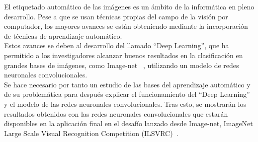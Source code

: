 El etiquetado automático de las imágenes es un ámbito de la informática en pleno desarrollo. Pese a que se usan técnicas propias del campo de la visión por computador, los mayores avances se están obteniendo mediante la incorporación de técnicas de aprendizaje automático.\\

Estos avances se deben al desarrollo del llamado ``Deep Learning'', que ha permitido a los investigadores alcanzar buenos resultados en la clasificación en grandes bases de imágenes, como Image-net ~\cite{imagenet_cvpr09}, utilizando un modelo de redes neuronales convolucionales.\\

Se hace necesario por tanto un estudio de las bases del aprendizaje automático y de su problemática para después explicar el funcionamiento del ``Deep Learning'' y el modelo de las redes neuronales convolucionales. Tras esto, se mostrarán los resultados obtenidos con las redes neuronales convolucionales que estarán disponibles en la aplicación final en el desafío lanzado desde Image-net, ImageNet Large Scale Visual Recognition Competition (ILSVRC)~\cite{ILSVRC15}.\\

